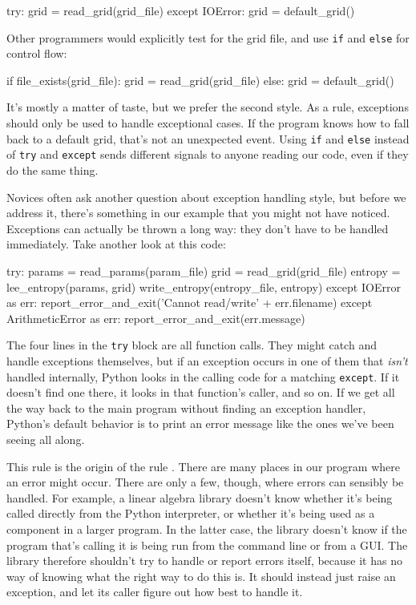\documentclass{book}
\begin{document}
\begin{VerbIn}
try:
    grid = read_grid(grid_file)
except IOError:
    grid = default_grid()
\end{VerbIn}

Other programmers would explicitly test for the grid file, and use
\texttt{if} and \texttt{else} for control flow:

\begin{VerbIn}
if file_exists(grid_file):
    grid = read_grid(grid_file)
else:
    grid = default_grid()
\end{VerbIn}

It's mostly a matter of taste, but we prefer the second style. As a
rule, exceptions should only be used to handle exceptional cases. If the
program knows how to fall back to a default grid, that's not an
unexpected event. Using \texttt{if} and \texttt{else} instead of
\texttt{try} and \texttt{except} sends different signals to anyone
reading our code, even if they do the same thing.

Novices often ask another question about exception handling style, but
before we address it, there's something in our example that you might
not have noticed. Exceptions can actually be thrown a long way: they
don't have to be handled immediately. Take another look at this code:

\begin{VerbIn}
try:
    params = read_params(param_file)
    grid = read_grid(grid_file)
    entropy = lee_entropy(params, grid)
    write_entropy(entropy_file, entropy)
except IOError as err:
    report_error_and_exit('Cannot read/write' + err.filename)
except ArithmeticError as err:
    report_error_and_exit(err.message)
\end{VerbIn}

The four lines in the \texttt{try} block are all function calls. They
might catch and handle exceptions themselves, but if an exception occurs
in one of them that \emph{isn't} handled internally, Python looks in the
calling code for a matching \texttt{except}. If it doesn't find one
there, it looks in that function's caller, and so on. If we get all the
way back to the main program without finding an exception handler,
Python's default behavior is to print an error message like the ones
we've been seeing all along.

This rule is the origin of the rule
. There
are many places in our program where an error might occur. There are
only a few, though, where errors can sensibly be handled. For example, a
linear algebra library doesn't know whether it's being called directly
from the Python interpreter, or whether it's being used as a component
in a larger program. In the latter case, the library doesn't know if the
program that's calling it is being run from the command line or from a
GUI. The library therefore shouldn't try to handle or report errors
itself, because it has no way of knowing what the right way to do this
is. It should instead just raise an exception, and let its caller figure
out how best to handle it.
\end{document}
